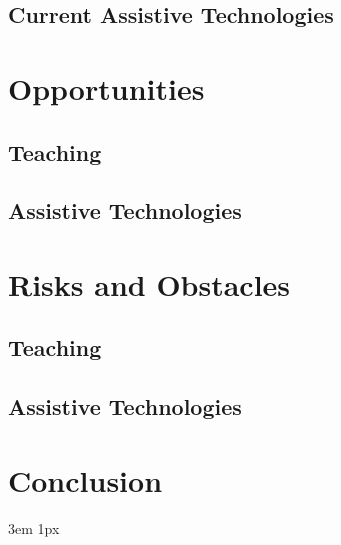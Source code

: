 \documentclass{Academic}
\begin{document}
    \subsection{Current Assistive Technologies}


    \section{Opportunities}

    \subsection{Teaching}

    \subsection{Assistive Technologies}

    \section{Risks and Obstacles}

    \subsection{Teaching}

    \subsection{Assistive Technologies}

    \section{Conclusion}

    \singlespacing
    \emergencystretch 3em
    \hfuzz 1px
    \printbibliography[heading=bibnumbered]




\end{document}
